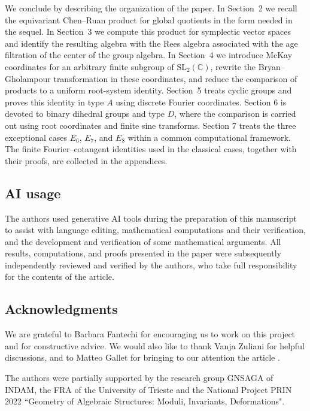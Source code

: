 \documentclass[a4paper,reqno]{amsart}
\theoremstyle{plain} %
\theoremstyle{definition} %
\theoremstyle{remark} %
\newcommand{\1}{\mathds{1}}   %
\begin{document}
We conclude by describing the organization of the paper.
In Section~2 we recall the equivariant Chen--Ruan product for global quotients
in the form needed in the sequel. In Section~3 we compute this product for
symplectic vector spaces and identify the resulting algebra with the Rees
algebra associated with the age filtration of the center of the group algebra.
In Section~4 we introduce McKay coordinates for an arbitrary finite subgroup
of $\mathrm{SL}_2(\mathbb C)$, rewrite the Bryan--Gholampour transformation in
these coordinates, and reduce the comparison of products to a uniform
root-system identity. Section~5 treats cyclic groups and proves this identity
in type $A$ using discrete Fourier coordinates. 
Section 6 is devoted to binary dihedral groups and type \(D\), 
where the comparison is carried out using root coordinates and finite sine transforms.
 Section 7 treats the three exceptional cases \(E_6\), \(E_7\), and \(E_8\) 
within a common computational framework. 
The finite Fourier–cotangent identities used in the classical cases, together with their proofs, are collected in the appendices.


\bigskip

\subsection*{AI usage}
The authors used generative AI tools during the preparation of this manuscript to assist with language editing, 
mathematical computations and their verification, and the development and verification of some mathematical arguments. 
All results, computations, and proofs presented in the paper were subsequently independently reviewed and verified by the authors, 
who take full responsibility for the contents of the article.


\subsection*{Acknowledgments} 
We are grateful to Barbara Fantechi for encouraging us to work on this project and for constructive advice.
We would also like to thank Vanja Zuliani for helpful discussions,
and to Matteo Gallet for bringing to our attention the article \cite{LiuXin}.

The  authors were partially supported by
the research group GNSAGA of INDAM, the FRA  of the University of Trieste and the
National Project PRIN 2022 ``Geometry of Algebraic Structures: Moduli, Invariants, Deformations".
\end{document}

